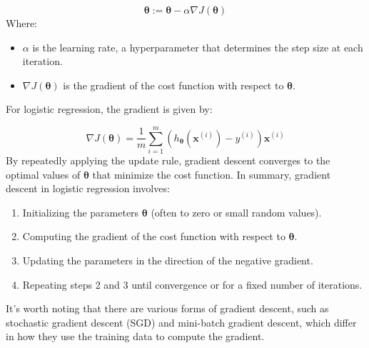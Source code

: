 \documentclass{article}
\begin{document}
\[
\mathbf{\theta} := \mathbf{\theta} - \alpha \nabla J(\mathbf{\theta})
\]
Where:
\begin{itemize}
    \item \( \alpha \) is the learning rate, a hyperparameter that determines the step size at each iteration.
    \item \( \nabla J(\mathbf{\theta}) \) is the gradient of the cost function with respect to \( \mathbf{\theta} \).
\end{itemize}
For logistic regression, the gradient is given by:

\[
\nabla J(\mathbf{\theta}) = \frac{1}{m} \sum_{i=1}^{m} (h_{\mathbf{\theta}}(\mathbf{x}^{(i)}) - y^{(i)}) \mathbf{x}^{(i)}
\]
By repeatedly applying the update rule, gradient descent converges to the optimal values of \( \mathbf{\theta} \) that minimize the cost function. In summary, gradient descent in logistic regression involves:
\begin{enumerate}
    \item Initializing the parameters \( \mathbf{\theta} \) (often to zero or small random values).
    \item Computing the gradient of the cost function with respect to \( \mathbf{\theta} \).
    \item Updating the parameters in the direction of the negative gradient.
    \item Repeating steps 2 and 3 until convergence or for a fixed number of iterations.
\end{enumerate}

It's worth noting that there are various forms of gradient descent, such as stochastic gradient descent (SGD) and mini-batch gradient descent, which differ in how they use the training data to compute the gradient.
\end{document}
